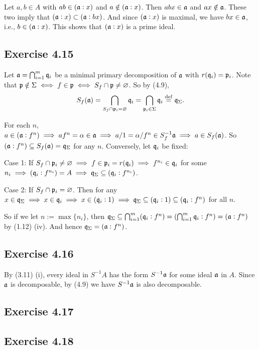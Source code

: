 \documentclass[../A&M.tex]{subfiles}
\begin{document}
Let $a,b \in A$ with $ab \in (\mathfrak{a}:x)$ and $a \notin (\mathfrak{a}:x)$. Then $abx \in \mathfrak{a}$ and $ax \notin \mathfrak{a}$. These two imply that $(\mathfrak{a}:x) \subset (\mathfrak{a}:bx)$. And since $(\mathfrak{a}:x)$ is maximal, we have $bx \in \mathfrak{a}$, i.e., $b \in (\mathfrak{a}:x)$. This shows that $(\mathfrak{a}:x)$ is a prime ideal.

\subsection*{Exercise 4.15}

Let $\mathfrak{a} = \bigcap_{i=1}^m \mathfrak{q}_i$ be a minimal primary decomposition of $\mathfrak{a}$ with $r(\mathfrak{q}_i)=\mathfrak{p}_i$. Note that $\mathfrak{p} \notin \Sigma \iff f \in \mathfrak{p} \iff S_f \cap \mathfrak{p} \neq \varnothing$. So by (4.9),
$$
S_f(\mathfrak{a})
= \bigcap_{S_f \cap \mathfrak{p}_i = \varnothing} \mathfrak{q}_i
= \bigcap_{\mathfrak{p}_i \in \Sigma} \mathfrak{q}_i
\overset{\operatorname{def}}{=} \mathfrak{q}_\Sigma.
$$

For each $n$, $a \in (\mathfrak{a}:f^n) \implies af^n = \alpha \in \mathfrak{a} \implies a/1 = \alpha/f^n \in S_f^{-1}\mathfrak{a} \implies a \in S_f(\mathfrak{a})$. So $(\mathfrak{a}:f^n) \subseteq S_f(\mathfrak{a}) = \mathfrak{q}_\Sigma$ for any $n$. Conversely, let $\mathfrak{q}_i$ be fixed:

Case 1: If $S_f \cap \mathfrak{p}_i \neq \varnothing \implies f \in \mathfrak{p}_i = r(\mathfrak{q}_i) \implies f^{n_i} \in \mathfrak{q}_i$ for some $n_i \implies (\mathfrak{q}_i:f^{n_i}) = A \implies \mathfrak{q}_\Sigma \subseteq (\mathfrak{q}_i : f^{n_i})$.

Case 2: If $S_f \cap \mathfrak{p}_i = \varnothing$. Then for any $x \in \mathfrak{q}_\Sigma \implies x \in \mathfrak{q}_i \implies x \in (\mathfrak{q}_i:1) \implies \mathfrak{q}_\Sigma \subseteq (\mathfrak{q}_i:1) \subseteq (\mathfrak{q}_i:f^n)$ for all $n$.

So if we let $n:=\max \{n_i\}$, then $\mathfrak{q}_\Sigma \subseteq \bigcap_{i=1}^m (\mathfrak{q}_i:f^n) = (\bigcap_{i=1}^m \mathfrak{q}_i : f^n) = (\mathfrak{a}:f^n)$ by (1.12) (iv). And hence $\mathfrak{q}_\Sigma = (\mathfrak{a}:f^n)$.

\subsection*{Exercise 4.16}

By (3.11) (i), every ideal in $S^{-1}A$ has the form $S^{-1}\mathfrak{a}$ for some ideal $\mathfrak{a}$ in $A$. Since $\mathfrak{a}$ is decomposable, by (4.9) we have $S^{-1}\mathfrak{a}$ is also decomposable.

\subsection*{Exercise 4.17}

\subsection*{Exercise 4.18}
\end{document}

